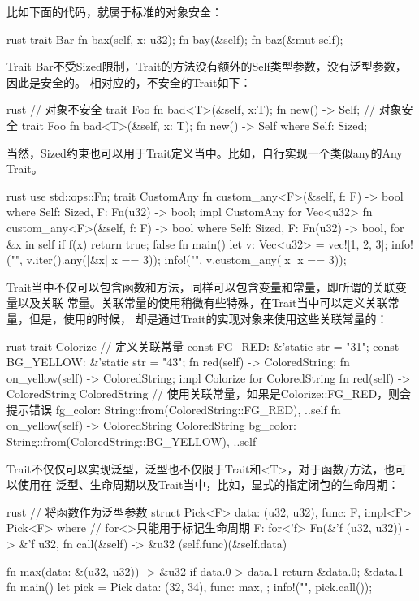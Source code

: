 比如下面的代码，就属于标准的对象安全：
\begin{code-block}{rust}
trait Bar {
    fn bax(self, x: u32);
    fn bay(&self);
    fn baz(&mut self);
}
\end{code-block}
Trait Bar不受Sized限制，Trait的方法没有额外的Self类型参数，没有泛型参数，因此是安全的。
相对应的，不安全的Trait如下：
\begin{code-block}{rust}
// 对象不安全
trait Foo {
    fn bad<T>(&self, x:T);
    fn new() -> Self;
}
// 对象安全
trait Foo {
    fn bad<T>(&self, x: T);
    fn new() -> Self
    where
        Self: Sized;
}
\end{code-block}

当然，Sized约束也可以用于Trait定义当中。比如，自行实现一个类似any的Any Trait。
\begin{code-block}{rust}
use std::ops::Fn;
trait CustomAny {
    fn custom_any<F>(&self, f: F) -> bool
    where
        Self: Sized,
        F: Fn(u32) -> bool;
}
impl CustomAny for Vec<u32> {
    fn custom_any<F>(&self, f: F) -> bool
    where
        Self: Sized,
        F: Fn(u32) -> bool,
    {
        for &x in self {
            if f(x) {
                return true;
            }
        }
        false
    }
}
fn main() {
    let v: Vec<u32> = vec![1, 2, 3];
    info!("{}", v.iter().any(|&x| x == 3));
    info!("{}", v.custom_any(|x| x == 3));
}
\end{code-block}

Trait当中不仅可以包含函数和方法，同样可以包含变量和常量，即所谓的关联变量以及关联
常量。关联常量的使用稍微有些特殊，在Trait当中可以定义关联常量，但是，使用的时候，
却是通过Trait的实现对象来使用这些关联常量的：
\begin{code-block}{rust}
trait Colorize {
    // 定义关联常量
    const FG_RED: &'static str = "31";
    const BG_YELLOW: &'static str = "43";
    fn red(self) -> ColoredString;
    fn on_yellow(self) -> ColoredString;
}
impl Colorize for ColoredString {
    fn red(self) -> ColoredString {
        ColoredString {
            // 使用关联常量，如果是Colorize::FG_RED，则会提示错误
            fg_color: String::from(ColoredString::FG_RED),
            ..self
        }
    }
    fn on_yellow(self) -> ColoredString {
        ColoredString {
            bg_color: String::from(ColoredString::BG_YELLOW),
            ..self
        }
    }
}
\end{code-block}

Trait不仅仅可以实现泛型，泛型也不仅限于Trait和<T>，对于函数/方法，也可以使用在
泛型、生命周期以及Trait当中，比如，显式的指定闭包的生命周期：
\begin{code-block}{rust}
// 将函数作为泛型参数
struct Pick<F> {
    data: (u32, u32),
    func: F,
}
impl<F> Pick<F>
where
    // for<>只能用于标记生命周期
    F: for<'f> Fn(&'f (u32, u32)) -> &'f u32,
{
    fn call(&self) -> &u32 {
        (self.func)(&self.data)
    }
}

fn max(data: &(u32, u32)) -> &u32 {
    if data.0 > data.1 {
        return &data.0;
    }
    &data.1
}
fn main() {
    let pick = Pick {
        data: (32, 34),
        func: max,
    };
    info!("{}", pick.call());
}
\end{code-block}

